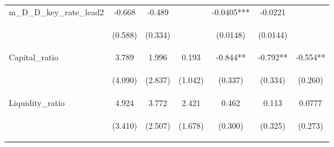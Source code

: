 \documentclass[]{article}
\begin{document}
\begin{center}
\begin{tabular}{lcccccc}
m\_D\_D\_key\_rate\_lead2 & -0.668 & -0.489 &  & -0.0405*** & -0.0221 &  \\
\vspace{4pt} & \begin{footnotesize}(0.588)\end{footnotesize} & \begin{footnotesize}(0.334)\end{footnotesize} & \begin{footnotesize}\end{footnotesize} & \begin{footnotesize}(0.0148)\end{footnotesize} & \begin{footnotesize}(0.0144)\end{footnotesize} & \begin{footnotesize}\end{footnotesize} \\
Capital\_ratio & 3.789 & 1.996 & 0.193 & -0.844** & -0.792** & -0.554** \\
\vspace{4pt} & \begin{footnotesize}(4.090)\end{footnotesize} & \begin{footnotesize}(2.837)\end{footnotesize} & \begin{footnotesize}(1.042)\end{footnotesize} & \begin{footnotesize}(0.337)\end{footnotesize} & \begin{footnotesize}(0.334)\end{footnotesize} & \begin{footnotesize}(0.260)\end{footnotesize} \\
Liquidity\_ratio & 4.924 & 3.772 & 2.421 & 0.462 & 0.113 & 0.0777 \\
\vspace{4pt} & \begin{footnotesize}(3.410)\end{footnotesize} & \begin{footnotesize}(2.507)\end{footnotesize} & \begin{footnotesize}(1.678)\end{footnotesize} & \begin{footnotesize}(0.300)\end{footnotesize} & \begin{footnotesize}(0.325)\end{footnotesize} & \begin{footnotesize}(0.273)\end{footnotesize} \\

\end{tabular}
\end{center}
\end{document}
